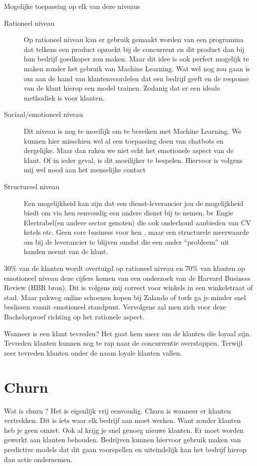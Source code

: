 Mogelijke toepassing op elk van deze niveaus

\begin{description}
	\item [Rationeel niveau] Op rationeel niveau kan er gebruik gemaakt worden van een programma dat telkens een product opzoekt bij de concurrent en dit product dan bij hun bedrijf goedkoper zou maken. Maar dit idee is ook perfect mogelijk te maken zonder het gebruik van Machine Learning. Wat wel nog zou gaan is om aan de hand van klantenvoordelen dat een bedrijf geeft en de response van de klant hierop een model trainen. Zodanig dat er een ideale methodiek is voor klanten.
	\item [Sociaal/emotioneel niveau]Dit niveau is nog te moeilijk om te bereiken met Machine Learning. We kunnen hier misschien wel al een toepassing doen van chatbots en dergelijke. Maar dan raken we niet echt het emotionele aspect van de klant. Of in ieder geval, is dit moeilijker te bespelen. Hiervoor is volgens mij wel nood aan het menselijke contact 
	\item [Structureel niveau] Een mogelijkheid kan zijn dat een dienst-leverancier jou de mogelijkheid biedt om via hen eenvoudig een andere dienst bij te nemen, bv Engie Electrabel(en andere sector genoten) die ook onderhoud aanbieden van CV ketels etc. Geen core business voor hen , maar een structurele meerwaarde om bij de leverancier te blijven omdat die een ander “probleem” uit handen neemt van de klant.
\end{description}

30\% van de klanten wordt overtuigd op rationeel niveau en 70\% van klanten op emotioneel niveau deze cijfers komen van een onderzoek van de Harvard Business Review (HBR bron). Dit is volgens mij correct voor winkels in een winkelstraat of stad. Maar pakweg online schoenen kopen bij Zalando of torfs ga je minder snel beslissen vanuit emotioneel standpunt. Vervolgens zal men zich voor deze Bachelorproef richting op het rationele aspect. 

Wanneer is een klant tevreden? Het gaat hem meer om de klanten die loyaal zijn. Tevreden klanten kunnen nog te rap naar de concurrentie overstappen. Terwijl zeer tevreden klanten onder de naam loyale klanten vallen.

\section{Churn}
\label{sec:Churn}
Wat is churn ? Het is eigenlijk vrij eenvoudig. Churn is wanneer er klanten vertrekken. Dit is iets waar elk bedrijf aan moet werken. Want zonder klanten heb je geen omzet. Ook al krijg je snel genoeg nieuwe klanten. Er moet worden gewerkt aan klanten behouden. Bedrijven kunnen hiervoor gebruik maken van predictive models dat dit gaan voorspellen en uiteindelijk kan het bedrijf hierop dan actie ondernemen.

